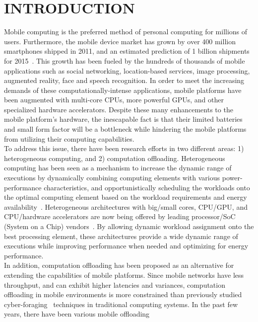 \chapter{INTRODUCTION}
\label{chap:introduction}

Mobile computing is the preferred method of personal computing
for millions of users.
%
Furthermore, the mobile device market has grown by over 400 million smartphones shipped
in 2011, and an estimated prediction of 1 billion shipments for
2015~\cite{dignan}.
%
This growth has been fueled by the hundreds of thousands of mobile
applications such as social networking, location-based services, image
processing, augmented reality, face and speech recognition.
%
In order to meet the increasing demands of these computationally-intense
applications, mobile platforms have been augmented with multi-core CPUs,
more powerful GPUs, and other specialized hardware accelerators.
%
Despite these many enhancements to the mobile platform's hardware,
the inescapable fact is that their limited batteries and small form
factor will be a bottleneck while hindering the mobile platforms from
utilizing their computing capabilities.\\
%
To address this issue, there have been research efforts in two different
areas: 1) heterogeneous computing, and 2) computation offloading.
%
Heterogeneous computing has been seen as a mechanism to increase the
dynamic range of executions by dynamically combining computing elements
with various power-performance characteristics, and opportunistically scheduling the
workloads onto the optimal computing element based on the workload
requirements and energy availability~\cite{chen}.
%
Heterogeneous architectures with big/small cores, CPU/GPU, and
CPU/hardware accelerators are now being offered by leading
processor/SoC (System on a Chip) vendors~\cite{bigprocessing, tegra}.
%
By allowing dynamic workload assignment onto the best processing
element, these architectures provide a wide dynamic range of executions
while improving performance when needed and optimizing for energy
performance.\\
%
In addition, computation offloading has been proposed as an alternative
for extending the capabilities of mobile platforms.
%
Since mobile networks have less throughput, and can exhibit higher
latencies and variances, computation offloading in mobile environments
is more constrained than previously studied cyber-foraging~\cite{cyber}
techniques in traditional computing systems.
%
In the past few years, there have been various mobile offloading
